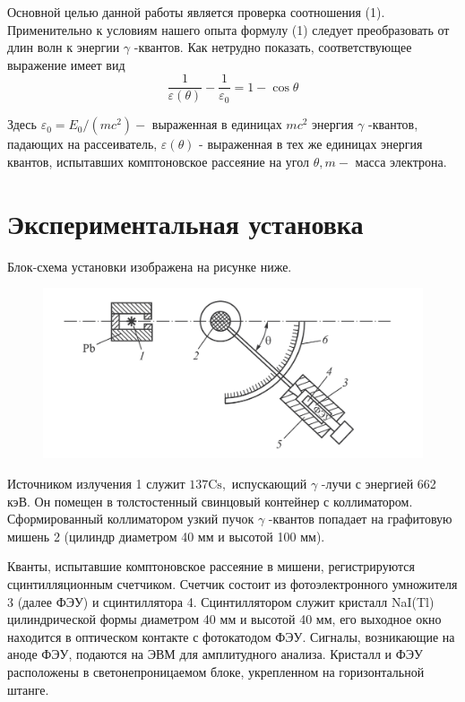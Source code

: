\documentclass[a4paper, 12pt]{article}
\begin{document}
    Основной целью данной работы является проверка соотношения
    (1). Применительно к условиям нашего опыта формулу
    (1) следует преобразовать от длин волн к энергии $\gamma$ -квантов. 
    Как нетрудно показать, соответствующее выражение имеет вид
    \begin{equation}
        \frac{1}{\varepsilon(\theta)}-\frac{1}{\varepsilon_{0}}=1-\cos \theta
    \end{equation}
    
    Здесь $\varepsilon_{0}=E_{0} /\left(m c^{2}\right)-$ выраженная в единицах $m c^{2}$ энергия $\gamma$ -квантов, 
    падающих на рассеиватель, $\varepsilon(\theta)$ - выраженная в тех же единицах энергия квантов, 
    испытавших комптоновское рассеяние на угол $\theta, m-$ масса электрона.

\section{Экспериментальная установка}
    Блок-схема установки изображена на рисунке ниже. 
    
    \begin{figure}[H]
        \centering
        \includegraphics[width=0.7\linewidth]{res/1.png}
    \end{figure}

    Источником излучения 1 служит $137 \mathrm{Cs},$ испускающий $\gamma$ -лучи с энергией 662 кэВ. 
    Он помещен в толстостенный свинцовый контейнер с коллиматором. 
    Сформированный коллиматором узкий пучок $\gamma$ -квантов попадает 
    на графитовую мишень 2 (цилиндр диаметром 40 мм и высотой 100 мм).
        
    Кванты, испытавшие комптоновское рассеяние в мишени, регистрируются сцинтилляционным счетчиком. 
    Счетчик состоит из фотоэлектронного умножителя 3 (далее ФЭУ) и сцинтиллятора 4. 
    Сцинтиллятором служит кристалл NaI(Tl) цилиндрической формы диаметром 40 мм и высотой 40 мм, 
    его выходное окно находится в оптическом контакте с фотокатодом ФЭУ. 
    Сигналы, возникающие на аноде ФЭУ, подаются на ЭВМ для амплитудного анализа. 
    Кристалл и ФЭУ расположены в светонепроницаемом блоке, укрепленном на горизонтальной штанге.     
\end{document}
